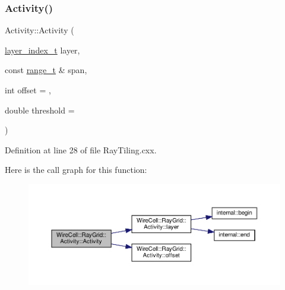 \subsubsection{\texorpdfstring{Activity()}{Activity()}\hspace{0.1cm}{\footnotesize\ttfamily [2/3]}}
{\footnotesize\ttfamily Activity\+::\+Activity (\begin{DoxyParamCaption}\item[{\hyperlink{namespace_wire_cell_1_1_ray_grid_ab7562e54b58eede813d5b70b5eb85812}{layer\+\_\+index\+\_\+t}}]{layer,  }\item[{const \hyperlink{class_wire_cell_1_1_ray_grid_1_1_activity_af70e5851ae6fb8d76415033c0f90cb3e}{range\+\_\+t} \&}]{span,  }\item[{int}]{offset = {},  }\item[{double}]{threshold = {} }\end{DoxyParamCaption})}



Definition at line 28 of file Ray\+Tiling.\+cxx.

Here is the call graph for this function\+:
\nopagebreak
\begin{figure}[H]
\begin{center}
\leavevmode
\includegraphics[width=350pt]{class_wire_cell_1_1_ray_grid_1_1_activity_abc20e03d0590c69828e595867a96b956_cgraph}
\end{center}
\end{figure}
\mbox{\label{class_wire_cell_1_1_ray_grid_1_1_activity_a455f994f3f4edeadcb60daab1ed10a19}} 
